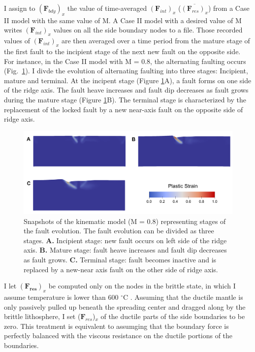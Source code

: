 \documentclass[letterpaper,12pt,notitle]{memphisthesis}                     %
\begin{document}
I assign to $(\boldsymbol{F}_{bdy})_x$ the value of time-averaged $(\boldsymbol{F}_{int})_x$ ($\overline{(\boldsymbol{F}_{res})_x}$) from a Case II model with the same value of M. A Case II model with a desired value of M writes $(\boldsymbol{F}_{int})_x$ values on all the side boundary nodes to a file. Those recorded values of $(\boldsymbol{F}_{int})_{x}$ are then averaged over a time period from the mature stage of the first fault to the incipient stage of the next new fault on the opposite side. For instance, in the Case II model with M = 0.8, the alternating faulting occurs (Fig.~\ref{fig:faultstage}). I divde the evolution of alternating faulting into three stages: Incipient, mature and terminal. At the incipent stage (Figure \ref{fig:faultstage}A), a fault forms on one side of the ridge axis. The fault heave increases and fault dip decreases as fault grows during the mature stage (Figure \ref{fig:faultstage}B). The terminal stage is characterized by the replacement of the locked fault by a new near-axis fault on the opposite side of ridge axis. 
%
\begin{figure}[!htb]
	\centering
	\includegraphics[width=0.9\linewidth]{./figs/fault_stage.pdf}
	\caption{Snapshots of the kinematic model (M = 0.8) representing stages of the fault evolution. The fault evolution can be divided as three stages. \textbf{A.} Incipient stage: new fault occurs on left side of the ridge axis. \textbf{B.} Mature stage: fault heave increases and fault dip decreases as fault grows. \textbf{C.} Terminal stage: fault becomes inactive and is replaced by a new-near axis fault on the other side of ridge axis.}
	\label{fig:faultstage}
\end{figure}

I let $(\boldsymbol{F_{res}})_x$ be computed only on the nodes in the brittle state, in which I assume temperature is lower than 600 $^\circ$C \citep[e.g.,][]{Violay2012}. Assuming that the ductile mantle is only passively pulled up beneath the spreading center and dragged along by the brittle lithosphere, I set ($\boldsymbol{F}_{res}$)$_x$ of the ductile parts of the side boundaries to be zero. This treatment is equivalent to assumging that the boundary force is perfectly balanced with the viscous resistance on the ductile portions of the boundaries. %
\end{document}
